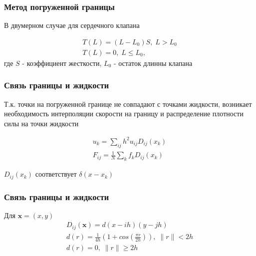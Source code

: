 \documentclass[14pt, notes]{beamer}
\begin{document}
\begin{frame}
\frametitle{Метод погруженной границы}
В двумерном случае для сердечного клапана

\begin{gather}
\label{eq:valve_leaflet}
T(L)=(L-L_0)S, \; L > L_0 \\
T(L)=0, \; L \leq L_0,
\end{gather}
где $S$ - коэффициент жесткости, $L_0$ - остаток длинны клапана
\end{frame}

\begin{frame}
\frametitle{Связь границы и жидкости}
Т.к. точки на погруженной границе не совпадают с точками жидкости, возникает необходимость интерполяции скорости на границу и распределение плотности силы на точки жидкости

\begin{gather}
\label{eq:interpolation}
u_k = \sum_{ij}h^{2} u_{ij} D_{ij}(x_k) \\
\label{eq:spreading}
F_{ij} = \frac{1}{N} \sum_k f_k D_{ij}(x_k)
\end{gather}

$D_{ij}(x_k)$ соответствует $\delta(x-x_k)$
\end{frame}

\begin{frame}
\frametitle{Связь границы и жидкости}
Для $\bm x=(x, y)$
\begin{gather}
\label{eq:force}
D_{ij}(\bm x) = d(x-ih)(y-jh) \\
\label{eq:delta_function}
d(r) = \frac{1}{4h}(1 + cos(\frac{\pi r}{2h})), \; \|r\| < 2h \\
d(r) = 0, \; \|r\| \geq 2h
\end{gather}
\end{frame}
\end{document}
